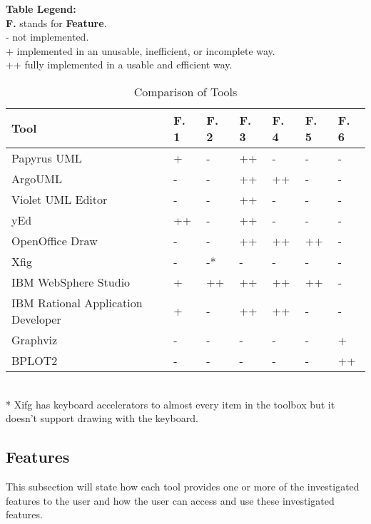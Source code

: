 \begin{center}
\begin{table}[ht]
\footnotesize
{\bf Table Legend:}\\
{\bf F.} stands for {\bf Feature}.\\
- not implemented.\\
+ implemented in an unusable, inefficient, or incomplete way.\\
++ fully implemented in a usable and efficient way.\\
\normalsize
	\begin{tabular}{ | l | l | l | l | l | l | l |}
	\hline
	{\bf Tool} & {\bf F. 1} & {\bf F. 2} & {\bf F. 3} & {\bf F. 4} & {\bf F. 5} & {\bf F. 6}\\ \hline \hline 
	Papyrus UML\cite{papyrus} & + & - & ++ & - & - & -\\ \hline
	ArgoUML\cite{argouml} & - & - & ++ & ++ & - & -\\ \hline
	Violet UML Editor\cite{violet} & - & - & ++ & - & - & -\\ \hline
	yEd\cite{yed} & ++ & - & ++ & - & - & -\\ \hline
	OpenOffice Draw\cite{oo_draw} & - & - & ++ & ++ & ++ & -\\ \hline
	Xfig\cite{xfig} & - & -* & - & - & - & -\\ \hline
	IBM WebSphere Studio\cite{ibm_websphere_studio} & + & ++ & ++ & ++ & ++ & -\\ \hline
	IBM Rational Application Developer\cite{ibm_rational_application_developper} & + & - & ++ & ++ & - & -\\ \hline
	Graphviz\cite{graphviz} & - & - & - & - & - & +\\ \hline
	BPLOT2\cite{bplot2} & - & - & - & - & - & ++\\ \hline
	\end{tabular}\\
\footnotesize
{* Xifg has keyboard accelerators to almost every item in the toolbox but it doesn't support drawing with the keyboard.}
\caption{Comparison of Tools}
\end{table}
\end{center}

\subsection{Features}
This subsection will state how each tool provides one or more of the investigated features to the user and how the user can access and use these investigated features.

